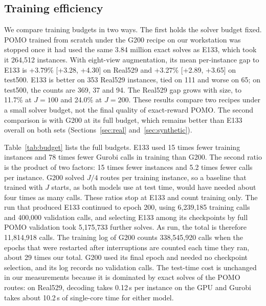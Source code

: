 \documentclass[preprint,12pt,authoryear]{elsarticle}
\begin{document}
\subsection{Training efficiency}
\label{sec:efficiency}

We compare training budgets in two ways. The first holds the solver budget fixed. POMO trained from scratch under the G200 recipe on our workstation was stopped once it had used the same 3.84 million exact solves as E133, which took it 264,512 instances. With eight-view augmentation, its mean per-instance gap to E133 is +3.79\% [+3.28, +4.30] on Real529 and +3.27\% [+2.89, +3.65] on test500. E133 is better on 353 Real529 instances, tied on 111 and worse on 65; on test500, the counts are 369, 37 and 94. The Real529 gap grows with size, to 11.7\% at $J = 100$ and 24.0\% at $J = 200$. These results compare two recipes under a small solver budget, not the final quality of exact-reward POMO. The second comparison is with G200 at its full budget, which remains better than E133 overall on both sets (Sections~\ref{sec:real} and~\ref{sec:synthetic}).

Table~\ref{tab:budget} lists the full budgets. E133 used 15 times fewer training instances and 78 times fewer Gurobi calls in training than G200. The second ratio is the product of two factors: 15 times fewer instances and 5.2 times fewer calls per instance. G200 solved $J/4$ routes per training instance, so a baseline that trained with $J$ starts, as both models use at test time, would have needed about four times as many calls. These ratios stop at E133 and count training only. The run that produced E133 continued to epoch 200, using 6,239,185 training calls and 400,000 validation calls, and selecting E133 among its checkpoints by full POMO validation took 5,175,733 further solves. As run, the total is therefore 11,814,918 calls. The training log of G200 counts 338,545,920 calls when the epochs that were restarted after interruptions are counted each time they ran, about 29 times our total. G200 used its final epoch and needed no checkpoint selection, and its log records no validation calls. The test-time cost is unchanged in our measurements because it is dominated by exact solves of the POMO routes: on Real529, decoding takes 0.12\,s per instance on the GPU and Gurobi takes about 10.2\,s of single-core time for either model.
\end{document}
